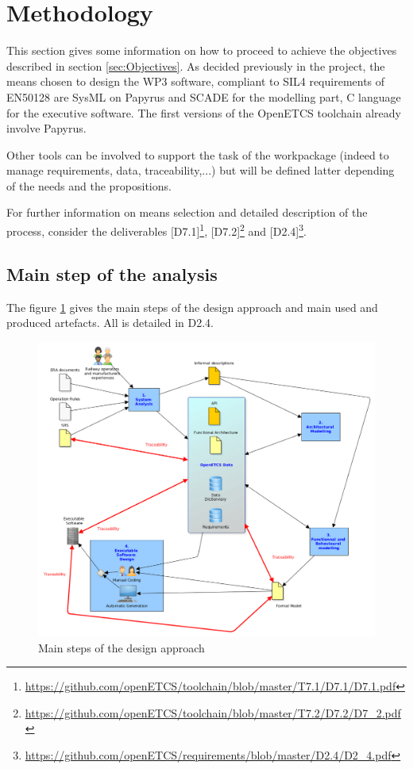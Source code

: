 \section{Methodology}


This section gives some information on how to proceed to achieve the  objectives described in section \ref{sec:Objectives}.
As decided previously in the project, the means chosen to design the WP3 software, compliant to SIL4 requirements of EN50128 are SysML on Papyrus and SCADE for the modelling part, C language for the executive software. The first versions of the OpenETCS toolchain already involve Papyrus.

Other tools can be involved to support the task of the workpackage (indeed to manage requirements, data, traceability,...) but will be defined latter depending of the needs and the propositions.

For further information on means selection and detailed description of the process, consider the deliverables [D7.1]\footnote{\url{https://github.com/openETCS/toolchain/blob/master/T7.1/D7.1/D7.1.pdf}}, [D7.2]\footnote{\url{https://github.com/openETCS/toolchain/blob/master/T7.2/D7.2/D7_2.pdf}} and [D2.4]\footnote{\url{https://github.com/openETCS/requirements/blob/master/D2.4/D2_4.pdf}}.

\subsection{Main step of the analysis}

The figure \ref{fig:Steps} gives the main steps of the design approach and main used and produced artefacts. All is detailed in D2.4.

\begin{figure}[ht]
  \centering
  \includegraphics[width=\textwidth]{sections/Step.png}
  \caption{Main steps of the design approach}
  \label{fig:Steps}
\end{figure}


